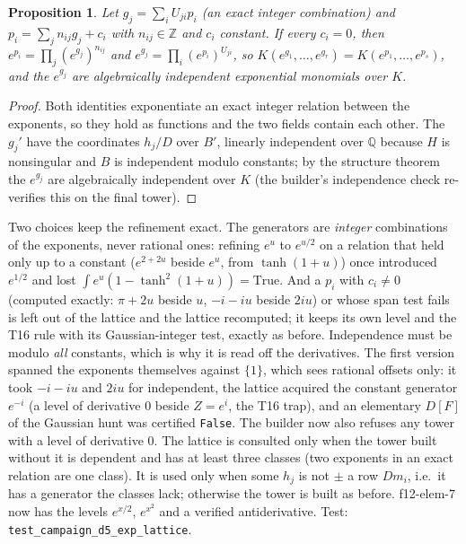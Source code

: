 \documentclass[11pt]{article}
\newtheorem{proposition}[theorem]{Proposition}
\theoremstyle{definition}
\theoremstyle{remark}
\newcommand{\Q}{\mathbb{Q}}
\newcommand{\Z}{\mathbb{Z}}
\newcommand{\code}[1]{\texttt{#1}}
\begin{document}
\begin{proposition}\label{prop:T20b}
Let $g_j=\sum_iU_{ji}p_i$ (an exact integer combination) and $p_i=\sum_jn_{ij}g_j+c_i$ with
$n_{ij}\in\Z$ and $c_i$ constant. If every $c_i=0$, then $e^{p_i}=\prod_j(e^{g_j})^{n_{ij}}$ and
$e^{g_j}=\prod_i(e^{p_i})^{U_{ji}}$, so $K(e^{g_1},\dots,e^{g_r})=K(e^{p_1},\dots,e^{p_s})$, and the
$e^{g_j}$ are algebraically independent exponential monomials over $K$.
\end{proposition}
\begin{proof}
Both identities exponentiate an exact integer relation between the exponents, so they hold
as functions and the two fields contain each other. The $g_j'$ have the coordinates
$h_j/D$ over $B'$, linearly independent over $\Q$ because $H$ is nonsingular and $B$ is
independent modulo constants; by the structure theorem the $e^{g_j}$ are algebraically
independent over $K$ (the builder's independence check re-verifies this on the final tower).
\end{proof}
\noindent Two choices keep the refinement exact. The generators are \emph{integer}
combinations of the exponents, never rational ones: refining $e^u$ to $e^{u/2}$ on a
relation that held only up to a constant ($e^{2+2u}$ beside $e^u$, from $\tanh(1+u)$) once
introduced $e^{1/2}$ and lost $\int e^u(1-\tanh^2(1+u))=\text{True}$. And a $p_i$ with
$c_i\ne0$ (computed exactly: $\pi+2u$ beside $u$, $-i-iu$ beside $2iu$) or whose span test
fails is left out of the lattice and the lattice recomputed; it keeps its own level and the
T16 rule with its Gaussian-integer test, exactly as before. Independence must be modulo
\emph{all} constants, which is why it is read off the derivatives. The first version spanned
the exponents themselves against $\{1\}$, which sees rational offsets only: it took $-i-iu$
and $2iu$ for independent, the lattice acquired the constant generator $e^{-i}$ (a level of
derivative $0$ beside $Z=e^i$, the T16 trap), and an elementary $D[F]$ of the Gaussian hunt was
certified \code{False}. The builder now also refuses any tower with a level of derivative
$0$. The lattice is consulted only
when the tower built without it is dependent and has at least three classes (two exponents in
an exact relation are one class). It is used only when some $h_j$ is not $\pm$ a row $Dm_i$,
i.e.\ it has a generator the classes lack; otherwise the tower is built as before. f12-elem-7 now has the levels $e^{x/2}$, $e^{x^2}$ and a verified
antiderivative. Test: \code{test\_campaign\_d5\_exp\_lattice}.
\end{document}
